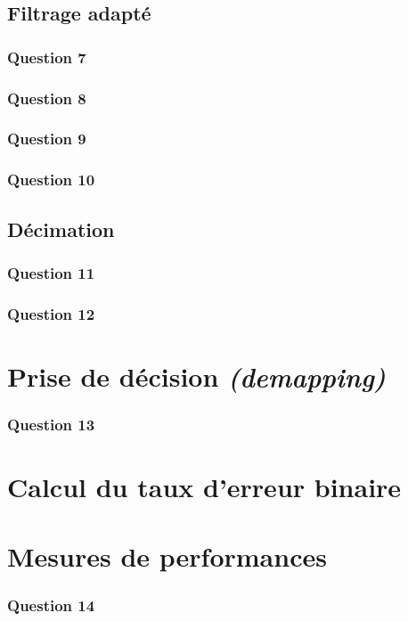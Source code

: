 \documentclass[a4paper,11pt]{article}
\begin{document}
\subsection{Filtrage adapté}
\subsubsection*{Question 7}
\subsubsection*{Question 8}
\subsubsection*{Question 9}
\subsubsection*{Question 10}

\subsection{Décimation}
\subsubsection*{Question 11}
\subsubsection*{Question 12}

\section{Prise de décision \emph{(demapping)}}
\subsubsection*{Question 13}

\section{Calcul du taux d'erreur binaire}

\section{Mesures de performances}
\subsubsection*{Question 14}

\end{document}
